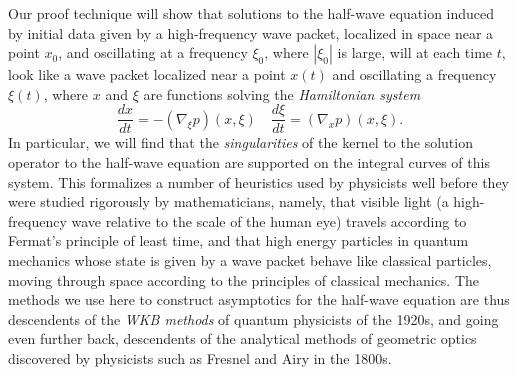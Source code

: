 \documentclass{article}
\theoremstyle{plain}
\theoremstyle{remark}
\theoremstyle{definition}
\begin{document}
Our proof technique will show that solutions to the half-wave equation induced by initial data given by a high-frequency wave packet, localized in space near a point $x_0$, and oscillating at a frequency $\xi_0$, where $|\xi_0|$ is large, will at each time $t$, look like a wave packet localized near a point $x(t)$ and oscillating a frequency $\xi(t)$, where $x$ and $\xi$ are functions solving the \emph{Hamiltonian system}
%
\[ \frac{dx}{dt} = - (\nabla_\xi p)(x, \xi) \quad \frac{d \xi}{dt} = (\nabla_x p)(x,\xi). \]
%
In particular, we will find that the \emph{singularities} of the kernel to the solution operator to the half-wave equation are supported on the integral curves of this system. This formalizes a number of heuristics used by physicists well before they were studied rigorously by mathematicians, namely, that visible light (a high-frequency wave relative to the scale of the human eye) travels according to Fermat's principle of least time, and that high energy particles in quantum mechanics whose state is given by a wave packet behave like classical particles, moving through space according to the principles of classical mechanics. The methods we use here to construct asymptotics for the half-wave equation are thus descendents of the \emph{WKB methods} of quantum physicists of the 1920s, and going even further back, descendents of the analytical methods of geometric optics discovered by physicists such as Fresnel and Airy in the 1800s.

\end{document}
